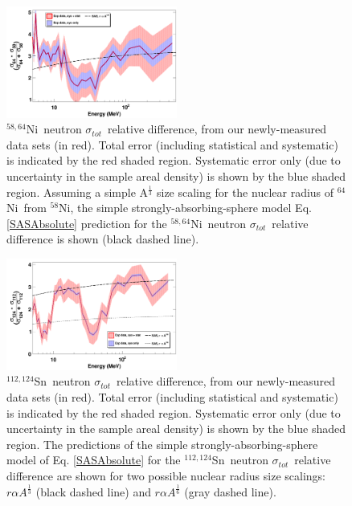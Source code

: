 \documentclass[twocolumn,secnumarabic,amssymb, nobibnotes, aps, prl,
superscriptaddress, nobalancelastpage]{revtex4}
\newcommand{\tot}{\ensuremath{\sigma_{tot}}}
\newcommand{\niEight}{\ensuremath{^{58}}N\lowercase{i}}
\newcommand{\niFour}{\ensuremath{^{64}}N\lowercase{i}}
\newcommand{\niEightFour}{\ensuremath{^{58,64}}N\lowercase{i}}
\newcommand{\snTwelveFour}{\ensuremath{^{112,124}}S\lowercase{n}}
\begin{document}
\begin{figure}[tb]
    \centering
    \includegraphics[width=0.5\textwidth]{figures/relativeDiff_Ni64Ni58.png}
    \caption[\niEightFour\ neutron \tot\ relative difference]
    {
        \niEightFour\ neutron \tot\ relative difference, from our newly-measured
        data sets (in red). Total error (including statistical and systematic)
        is indicated by the red shaded region. Systematic error only (due to
        uncertainty in the sample areal density) is shown by the blue shaded region.   
        Assuming a simple A$^{\frac{1}{3}}$ size scaling for the
        nuclear radius of \niFour\ from \niEight, the simple
        strongly-absorbing-sphere model Eq. \ref{SASAbsolute} prediction
        for the \niEightFour\ neutron \tot\ relative
        difference is shown (black dashed line).
    }
    \label{IsotopicDifferenceNi}
\end{figure}

\begin{figure}[tb]
    \centering
    \includegraphics[width=0.5\textwidth]{figures/relativeDiff_Sn124Sn112.png}
    \caption[\snTwelveFour\ neutron \tot\ relative difference]
    {
        \snTwelveFour\ neutron \tot\ relative difference, from our newly-measured
        data sets (in red). Total error (including statistical and systematic)
        is indicated by the red shaded region. Systematic error only (due to
        uncertainty in the sample areal density) is shown by the blue shaded region.   
        The predictions of the simple strongly-absorbing-sphere model of
        Eq. \ref{SASAbsolute} for the \snTwelveFour\ neutron \tot\ relative
        difference are shown for two possible nuclear radius size scalings: $r \alpha A^{\frac{1}{3}}$
        (black dashed line) and $r \alpha A^{\frac{1}{6}}$ (gray dashed line).
    }
    \label{IsotopicDifferenceSn}
\end{figure}
\end{document}
